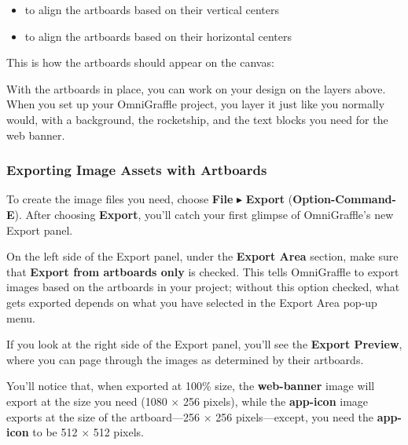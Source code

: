 \documentclass[../main.tex]{subfiles}
\begin{document}
\begin{enumerate}
    \begin{itemize}
      \item {} to align the artboards based on
        their vertical centers
      \item {} to align the artboards based on
        their horizontal centers
    \end{itemize}
\end{enumerate}

This is how the artboards should appear on the canvas:


With the artboards in place, you can work on your design on the layers above. When you set up
your OmniGraffle project, you layer it just like you normally would, with a background, the
rocketship, and the text blocks you need for the web banner.


\subsubsection{Exporting Image Assets with Artboards}

To create the image files you need, choose \textbf{File} $\blacktriangleright$ \textbf{Export}
(\textbf{Option-Command-E}). After choosing \textbf{Export}, you'll catch your first glimpse
of OmniGraffle's new Export panel.


On the left side of the Export panel, under the \textbf{Export Area} section, make sure that
\textbf{Export from artboards only} is checked. This tells OmniGraffle to export images based
on the artboards in your project; without this option checked, what gets exported depends on
what you have selected in the Export Area pop-up menu.

If you look at the right side of the Export panel, you'll see the \textbf{Export Preview}, where
you can page through the images as determined by their artboards.


You'll notice that, when exported at 100\% size, the \textbf{web-banner} image will export at
the size you need (1080 $\times$ 256 pixels), while the \textbf{app-icon} image exports at the
size of the artboard---256 $\times$ 256 pixels---except, you need the \textbf{app-icon} to be
512 $\times$ 512 pixels.
\end{document}
